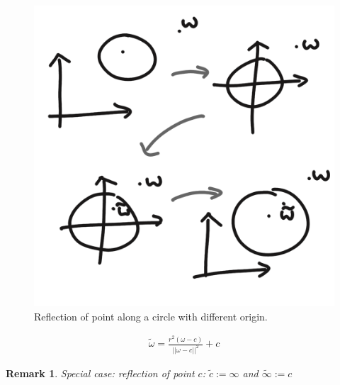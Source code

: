 \documentclass[]{article}
\newtheorem{remark}{Remark}
\begin{document}
\begin{figure}[h!]
	\centering
	\includegraphics[width=0.3\linewidth]{figures/reflection_on_any_circle}
	\caption{Reflection of point along a circle with different origin.}
	\label{fig:reflection_on_any_circle}
\end{figure}

\begin{align*}
	\tilde{\omega} = \frac{r^2(\omega - c)}{||\omega - c||^2} + c
\end{align*}

\begin{remark}
	Special case: reflection of point $c$: $\tilde{c} := \infty$ and $\tilde{\infty} := c$
\end{remark}
\end{document}
